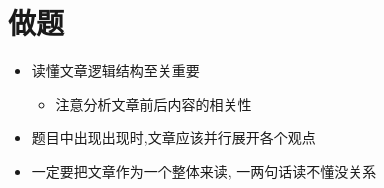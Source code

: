 \chapter{做题}

\begin{itemize}
  \item 读懂文章逻辑结构至关重要
  \begin{itemize}
    \item 注意分析文章前后内容的相关性
  \end{itemize}

  \item 题目中出现出现时,文章应该并行展开各个观点
  \item 一定要把文章作为一个整体来读, 一两句话读不懂没关系
\end{itemize}